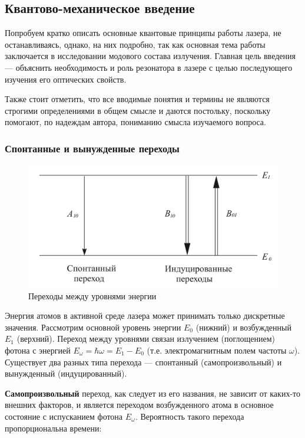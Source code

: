 \documentclass[12pt]{kiarticle}
\begin{document}
\subsection{Квантово-механическое введение}

Попробуем кратко описать основные квантовые принципы работы лазера, не останавливаясь, однако, на них подробно, так как основная тема работы заключается в исследовании модового состава излучения. Главная цель введения --- объяснить необходимость и роль резонатора в лазере с целью последующего изучения его оптических свойств.

 Также стоит отметить, что все вводимые понятия и термины не являются строгими определениями в общем смысле и даются постольку, поскольку помогают, по надеждам автора, пониманию смысла изучаемого вопроса. 

\subsubsection{Спонтанные и вынужденные переходы}

\begin{figure} 
	\includegraphics[width=\linewidth]{levels}
	\caption{Переходы между уровнями энергии}
	\label{levels}
\end{figure}

Энергия атомов в активной среде лазера может принимать только дискретные значения. Рассмотрим основной уровень энергии $ E_0 $ (нижний) и возбужденный $ E_1 $ (верхний). Переход между уровнями связан излучением (поглощением) фотона с энергией $ E_\omega = \hbar\omega = E_1 - E_0 $ (т.е. электромагнитным полем частоты $ \omega $). Существует два разных типа перехода --- спонтанный (самопроизвольный) и вынужденный (индуцированный). 

\textbf{Самопроизвольный} переход, как следует из его названия, не зависит от каких-то внешних факторов, и является переходом возбужденного атома в основное состояние с испусканием фотона $ E_\omega $. Вероятность такого перехода пропорциональна времени:
\end{document}
